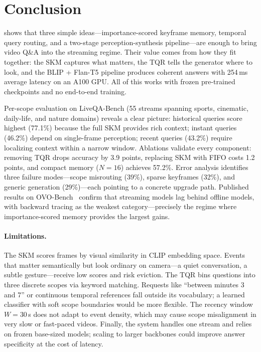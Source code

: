 \section{Conclusion}
\label{sec:conclusion}

\ours shows that three simple ideas---importance-scored keyframe memory, temporal query routing, and a two-stage perception-synthesis pipeline---are enough to bring video Q\&A into the streaming regime.
Their value comes from how they fit together: the SKM captures what matters, the TQR tells the generator where to look, and the BLIP + Flan-T5 pipeline produces coherent answers with 254\,ms average latency on an A100 GPU.
All of this works with frozen pre-trained checkpoints and no end-to-end training.

Per-scope evaluation on LiveQA-Bench (55 streams spanning sports, cinematic, daily-life, and nature domains) reveals a clear picture:
historical queries score highest (77.1\%) because the full SKM provides rich context;
instant queries (46.2\%) depend on single-frame perception;
recent queries (43.2\%) require localizing context within a narrow window.
Ablations validate every component: removing TQR drops accuracy by 3.9 points, replacing SKM with FIFO costs 1.2 points, and compact memory ($N\!=\!16$) achieves 57.2\%.
Error analysis identifies three failure modes---scope misrouting (39\%), sparse keyframes (32\%), and generic generation (29\%)---each pointing to a concrete upgrade path.
Published results on OVO-Bench~\cite{li2025ovobench} confirm that streaming models lag behind offline models, with backward tracing as the weakest category---precisely the regime where importance-scored memory provides the largest gains.

\paragraph{Limitations.}
The SKM scores frames by visual similarity in CLIP embedding space. Events that matter semantically but look ordinary on camera---a quiet conversation, a subtle gesture---receive low scores and risk eviction.
The TQR bins questions into three discrete scopes via keyword matching. Requests like ``between minutes 3 and 7'' or continuous temporal references fall outside its vocabulary; a learned classifier with soft scope boundaries would be more flexible.
The recency window $W\!=\!30$\,s does not adapt to event density, which may cause scope misalignment in very slow or fast-paced videos.
Finally, the system handles one stream and relies on frozen base-sized models; scaling to larger backbones could improve answer specificity at the cost of latency.


